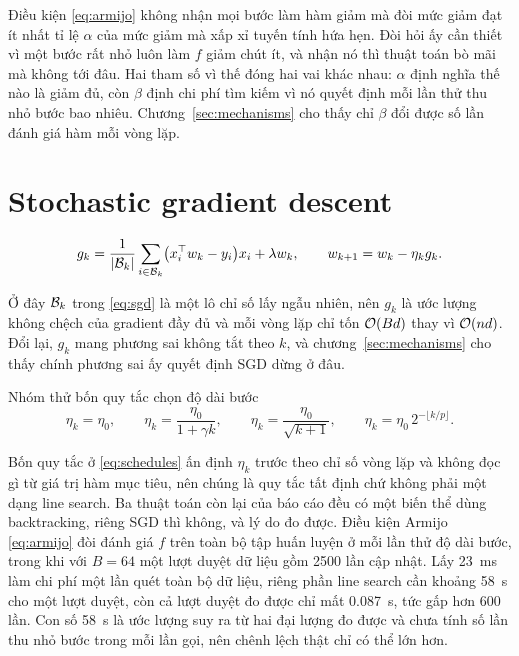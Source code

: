Điều kiện \eqref{eq:armijo} không nhận mọi bước làm hàm giảm mà đòi mức giảm đạt
ít nhất tỉ lệ $\alpha$ của mức giảm mà xấp xỉ tuyến tính hứa hẹn. Đòi hỏi ấy cần
thiết vì một bước rất nhỏ luôn làm $f$ giảm chút ít, và nhận nó thì thuật toán bò
mãi mà không tới đâu. Hai tham số vì thế đóng hai vai khác nhau: $\alpha$ định
nghĩa thế nào là giảm đủ, còn $\beta$ định chi phí tìm kiếm vì nó quyết định mỗi
lần thử thu nhỏ bước bao nhiêu. Chương~\ref{sec:mechanisms} cho thấy chỉ $\beta$
đổi được số lần đánh giá hàm mỗi vòng lặp.

\section{Stochastic gradient descent}
\label{sec:impl-sgd}

\begin{equation}
  \label{eq:sgd}
  g_k = \frac{1}{\lvert\mathcal{B}_k\rvert} \sum_{i \in \mathcal{B}_k}
        \bigl( x_i^{\top} w_k - y_i \bigr) x_i + \lambda w_k,
  \qquad
  w_{k+1} = w_k - \eta_k g_k .
\end{equation}

Ở đây $\mathcal{B}_k$ trong \eqref{eq:sgd} là một lô chỉ số lấy ngẫu nhiên, nên $g_k$
là ước lượng không chệch của gradient đầy đủ và mỗi vòng lặp chỉ tốn $\mathcal{O}(Bd)$ thay vì
$\mathcal{O}(nd)$. Đổi lại, $g_k$ mang phương sai không tắt theo $k$, và
chương~\ref{sec:mechanisms} cho thấy chính phương sai ấy quyết định SGD dừng ở
đâu.

Nhóm thử bốn quy tắc chọn độ dài bước~\cite{bottou2018optimization}
%
\begin{equation}
  \label{eq:schedules}
  \eta_k = \eta_0, \qquad
  \eta_k = \frac{\eta_0}{1 + \gamma k}, \qquad
  \eta_k = \frac{\eta_0}{\sqrt{k+1}}, \qquad
  \eta_k = \eta_0 \, 2^{-\lfloor k / p \rfloor} .
\end{equation}

Bốn quy tắc ở \eqref{eq:schedules} ấn định $\eta_k$ trước theo chỉ số vòng lặp và
không đọc gì từ giá trị hàm mục tiêu, nên chúng là quy tắc tất định chứ không
phải một dạng line search. Ba thuật toán còn lại của báo cáo đều có một biến thể
dùng backtracking, riêng SGD thì không, và lý do đo được. Điều kiện Armijo
\eqref{eq:armijo} đòi đánh giá $f$ trên toàn bộ tập huấn luyện ở mỗi lần thử độ
dài bước, trong khi với $B = 64$ một lượt duyệt dữ liệu gồm \num{2500} lần cập
nhật. Lấy \SI{23}{\milli\second} làm chi phí một lần quét toàn bộ dữ liệu,
riêng phần line search cần khoảng \SI{58}{\second} cho một lượt duyệt, còn cả
lượt duyệt đo được chỉ mất \SI{0.087}{\second}, tức gấp hơn 600 lần. Con số
\SI{58}{\second} là ước lượng suy ra từ hai đại lượng đo được và chưa tính số lần
thu nhỏ bước trong mỗi lần gọi, nên chênh lệch thật chỉ có thể lớn hơn.

